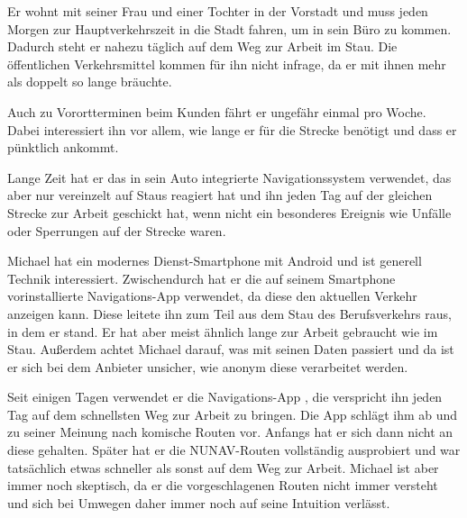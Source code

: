Er wohnt mit seiner Frau und einer Tochter in der Vorstadt und muss jeden Morgen zur Hauptverkehrszeit in die Stadt fahren, um in sein Büro zu kommen. Dadurch steht er nahezu täglich auf dem Weg zur Arbeit im Stau. Die öffentlichen Verkehrsmittel kommen für ihn nicht infrage, da er mit ihnen mehr als doppelt so lange bräuchte.

Auch zu Vorortterminen beim Kunden fährt er ungefähr einmal pro Woche. Dabei interessiert ihn vor allem, wie lange er für die Strecke benötigt und dass er pünktlich ankommt.

Lange Zeit hat er das in sein Auto integrierte Navigationssystem verwendet, das aber nur vereinzelt auf Staus reagiert hat und ihn jeden Tag auf der gleichen Strecke zur Arbeit geschickt hat, wenn nicht ein besonderes Ereignis wie Unfälle oder Sperrungen auf der Strecke waren.

Michael hat ein modernes Dienst-Smartphone mit Android und ist generell Technik interessiert. Zwischendurch hat er die auf seinem Smartphone vorinstallierte Navigations-App verwendet, da diese den aktuellen Verkehr anzeigen kann. Diese leitete ihn zum Teil aus dem Stau des Berufsverkehrs raus, in dem er stand. Er hat aber meist ähnlich lange zur Arbeit gebraucht wie im Stau. Außerdem achtet Michael darauf, was mit seinen Daten passiert und da ist er sich bei dem Anbieter unsicher, wie anonym diese verarbeitet werden.

Seit einigen Tagen verwendet er die Navigations-App , die verspricht ihn jeden Tag auf dem schnellsten Weg zur Arbeit zu bringen. Die App schlägt ihm ab und zu seiner Meinung nach \glqq komische\grqq{} Routen vor. Anfangs hat er sich dann nicht an diese gehalten. Später hat er die NUNAV-Routen vollständig ausprobiert und war tatsächlich etwas schneller als sonst auf dem Weg zur Arbeit. Michael ist aber immer noch skeptisch, da er die vorgeschlagenen Routen nicht immer versteht und sich bei Umwegen daher immer noch auf seine Intuition verlässt.

\newpage